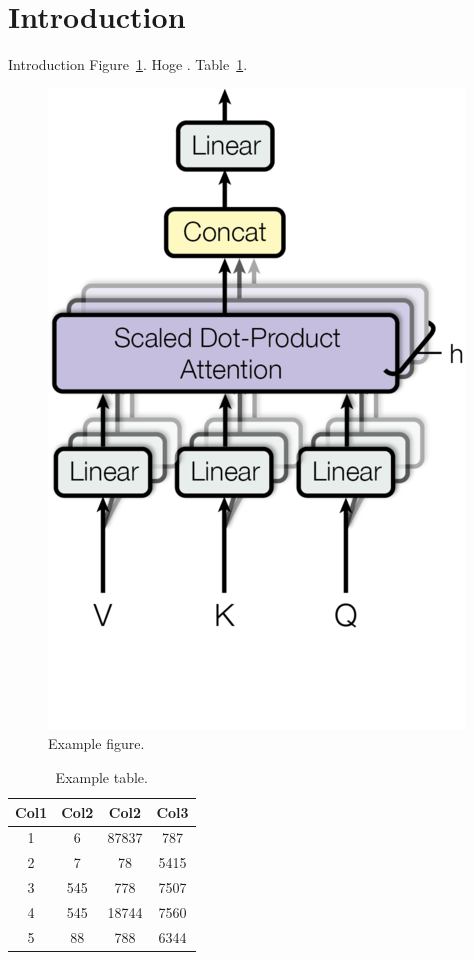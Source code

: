 
\section{Introduction}
Introduction Figure~\ref{fig:ex-fig}. Hoge \cite{devlin-etal-2019-bert}. Table~\ref{tab:ex-tab}.

\begin{figure}[h]
    \centering
    \includegraphics{figures/fig-vkq.png}
    \caption{Example figure.}
    \label{fig:ex-fig}
\end{figure}

\begin{table}[h]
    \centering
    \begin{tabular}{||c c c c||} 
        \hline
        Col1 & Col2 & Col2 & Col3 \\ [0.5ex] 
        \hline\hline
        1 & 6 & 87837 & 787 \\ 
        2 & 7 & 78 & 5415 \\
        3 & 545 & 778 & 7507 \\
        4 & 545 & 18744 & 7560 \\
        5 & 88 & 788 & 6344 \\ [1ex] 
        \hline
    \end{tabular}
    \caption{Example table.}
    \label{tab:ex-tab}
\end{table}
